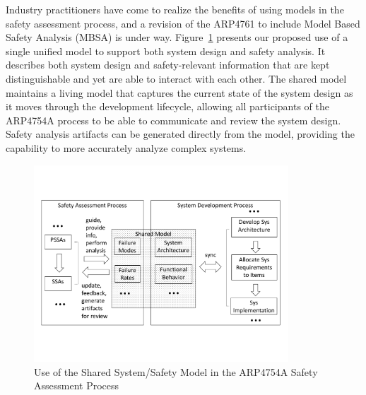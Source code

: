 
Industry practitioners have come to realize the benefits of using models in the safety assessment process, and a revision of the ARP4761 to include Model Based Safety Analysis (MBSA) is under way.
Figure~\ref{fig:proposed_safety_process} presents our proposed use of a single unified model to support both system design and safety analysis. It describes both system design and safety-relevant information %
that are kept distinguishable and yet are able to interact with each other. The shared model maintains a living model that captures the current state of the system design as it moves through the development lifecycle, allowing all participants of the ARP4754A process to be able to communicate and review the system design. Safety analysis artifacts can be generated directly from the model, %
providing
the capability to more accurately analyze complex systems.

\begin{figure}[t!]
	\vspace{-0.45in}
	\centering
	\includegraphics[trim=0 9 0 5,clip,width=0.85\textwidth]{images/safety_process.pdf}
	\vspace{-0.45in}
	\caption{Use of the Shared System/Safety Model in the ARP4754A Safety Assessment Process}
	\label{fig:proposed_safety_process}
\end{figure}

